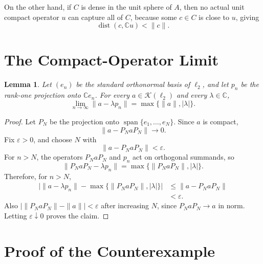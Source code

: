 \documentclass[11pt]{article}
\newtheorem{lemma}{Lemma}
\newcommand{\C}{\mathbb C}
\newcommand{\Kcal}{\mathcal K}
\newcommand{\dist}{\operatorname{dist}}
\begin{document}
On the other hand, if \(C\) is dense in the unit sphere of \(A\), then no
actual unit compact operator \(u\) can capture all of \(C\), because some
\(c\in C\) is close to \(u\), giving
\[
        \dist(c,\C u)<\|c\|.
\]

\section*{The Compact-Operator Limit}

\begin{lemma}
\label{lem:limit}
Let \((e_n)\) be the standard orthonormal basis of \(\ell_2\), and let
\(p_n\) be the rank-one projection onto \(\C e_n\).  For every
\(a\in\Kcal(\ell_2)\) and every \(\lambda\in\C\),
\[
        \lim_{n\to\infty}\|a-\lambda p_n\|
        =
        \max\{\|a\|,|\lambda|\}.
\]
\end{lemma}

\begin{proof}
Let \(P_N\) be the projection onto
\(\operatorname{span}\{e_1,\ldots,e_N\}\).  Since \(a\) is compact,
\[
        \|a-P_NaP_N\|\longrightarrow0.
\]
Fix \(\varepsilon>0\), and choose \(N\) with
\[
        \|a-P_NaP_N\|<\varepsilon .
\]
For \(n>N\), the operators \(P_NaP_N\) and \(p_n\) act on orthogonal summands,
so
\[
        \|P_NaP_N-\lambda p_n\|
        =
        \max\{\|P_NaP_N\|,|\lambda|\}.
\]
Therefore, for \(n>N\),
\[
\begin{aligned}
 \bigl|\|a-\lambda p_n\|
       -\max\{\|P_NaP_N\|,|\lambda|\}\bigr|
 &\le \|a-P_NaP_N\|\\
 &<\varepsilon .
\end{aligned}
\]
Also \(|\|P_NaP_N\|-\|a\||<\varepsilon\) after increasing \(N\), since
\(P_NaP_N\to a\) in norm.  Letting \(\varepsilon\downarrow0\) proves the
claim.
\end{proof}

\section*{Proof of the Counterexample}
\end{document}
